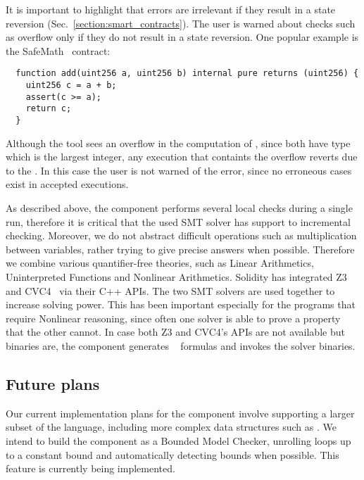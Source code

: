 It is important to highlight that errors are irrelevant if they result in a
state reversion (Sec.~\ref{section:smart_contracts}). The user is warned
about checks such as overflow only if they do not result in a state reversion.
%
One popular example is the SafeMath~\cite{SafeMath} contract:

\begin{verbatim}
  function add(uint256 a, uint256 b) internal pure returns (uint256) {
    uint256 c = a + b;
    assert(c >= a);
    return c;
  }
\end{verbatim}

Although the tool sees an overflow in the computation of , since
both have type  which is the largest integer, any execution that
containts the overflow reverts due to the .
%
In this case the user is not warned of the error, since no erroneous cases
exist in accepted executions.

As described above, the component performs several local checks during a single
run, therefore it is critical that the used SMT solver has support to
incremental checking.
%
Moreover, we do not abstract difficult operations such as multiplication
between variables, rather trying to give precise answers when possible.
%
Therefore we combine various quantifier-free theories, such as Linear
Arithmetics, Uninterpreted Functions and Nonlinear Arithmetics. 
%
Solidity has integrated Z3~\cite{Z3} and CVC4~\cite{CVC4} via their C++ APIs.
%
The two SMT solvers are used together to increase solving power.
%
This has been important especially for the programs that require Nonlinear
reasoning, since often one solver is able to prove a property that the other
cannot.
%
In case both Z3 and CVC4's APIs are not available but binaries are, the
component generates ~\cite{SMTLIB} formulas and invokes the
solver binaries.


\subsection{Future plans}

Our current implementation plans for the component involve supporting
a larger subset of the language, including more complex data structures
such as .
%
We intend to build the component as a Bounded Model Checker, unrolling loops
up to a constant bound and automatically detecting bounds when possible.
%
This feature is currently being implemented.

